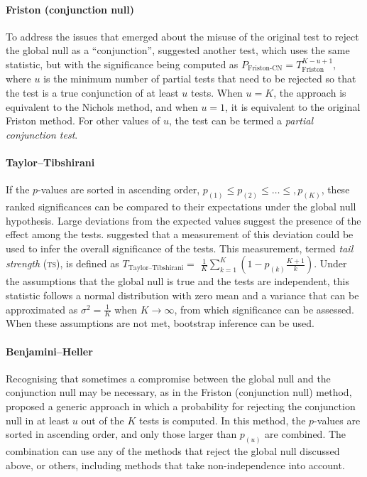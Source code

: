 \paragraph{Friston (conjunction null)} To address the issues that emerged about the misuse of the original test to reject the global null as a ``conjunction'', \citet{Friston2005} suggested another test, which uses the same statistic, but with the significance being computed as $P_{\text{Friston-CN}}=T^{K-u+1}_{\text{Friston}}$, where $u$ is the minimum number of partial tests that need to be rejected so that the test is a true conjunction of at least $u$ tests. When $u=K$, the approach is equivalent to the Nichols method, and when $u=1$, it is equivalent to the original Friston method. For other values of $u$, the test can be termed a \emph{partial conjunction test}.

\paragraph{Taylor--Tibshirani} If the $p$-values are sorted in ascending order, $p_{(1)} \leqslant p_{(2)} \leqslant \ldots \leqslant, p_{(K)}$, these ranked significances can be compared to their expectations under the global null hypothesis. Large deviations from the expected values suggest the presence of the effect among the tests. \citet{Taylor2006} suggested that a measurement of this deviation could be used to infer the overall significance of the tests. This measurement, termed \emph{tail strength} (\textsc{ts}), is defined as $T_{\text{Taylor--Tibshirani}} =$ $\frac{1}{K} \sum_{k=1}^{K} \left(1-p_{(k)}\frac{K+1}{k}\right)$. Under the assumptions that the global null is true and the tests are independent, this statistic follows a normal distribution with zero mean and a variance that can be approximated as $\sigma^2=\frac{1}{K}$ when $K \rightarrow \infty$, from which significance can be assessed. When these assumptions are not met, bootstrap inference can be used.

\paragraph{Benjamini--Heller} Recognising that sometimes a compromise between the global null and the conjunction null may be necessary, as in the Friston (conjunction null) method, \citet{Benjamini2008} proposed a generic approach in which a probability for rejecting the conjunction null in at least $u$ out of the $K$ tests is computed. In this method, the $p$-values are sorted in ascending order, and only those larger than $p_{(u)}$ are combined. The combination can use any of the methods that reject the global null discussed above, or others, including methods that take non-independence into account.

